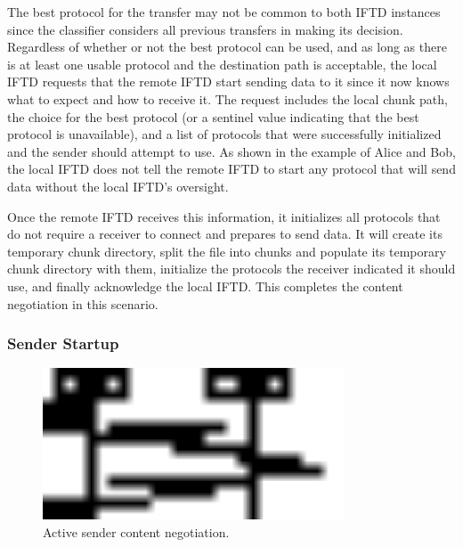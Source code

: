 The best protocol for the transfer may not be common to both IFTD instances since the classifier considers all previous transfers in making its decision.  Regardless of whether or not the best protocol can be used, and as long as there is at least one usable protocol and the destination path is acceptable, the local IFTD requests that the remote IFTD start sending data to it since it now knows what to expect and how to receive it.  The request includes the local chunk path, the choice for the best protocol (or a sentinel value indicating that the best protocol is unavailable), and a list of protocols that were successfully initialized and the sender should attempt to use.  As shown in the example of Alice and Bob, the local IFTD does not tell the remote IFTD to start any protocol that will send data without the local IFTD's oversight.

Once the remote IFTD receives this information, it initializes all protocols that do not require a receiver to connect and prepares to send data.  It will create its temporary chunk directory, split the file into chunks and populate its temporary chunk directory with them, initialize the protocols the receiver indicated it should use, and finally acknowledge the local IFTD.  This completes the content negotiation in this scenario.

\subsubsection{Sender Startup}

\begin{figure}[h!]
    \centering
    \includegraphics[width=0.8\textwidth]{diagrams/iftd-active-sender-setup}
    \caption{Active sender content negotiation.}
    \label{iftd-active-sender-setup}
\end{figure}

